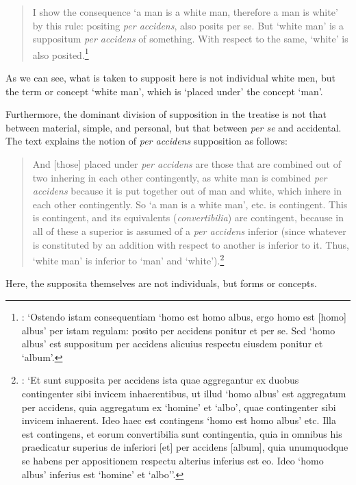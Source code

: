 \documentclass[a4paper, 11pt]{article}
\begin{document}
\begin{quote}
I show the consequence `a man is a white man, therefore a man is white' by this rule: positing \emph{per accidens}, also posits per se. But `white man' is a suppositum \emph{per accidens} of something. With respect to the same, `white' is also posited.\footnote{\autocite[18, par. 34]{Green-Pedersen1980a}: `Ostendo istam consequentiam `homo est homo albus, ergo homo est [homo] albus' per istam regulam: posito per accidens ponitur et per se. Sed `homo albus' est suppositum per accidens alicuius respectu eiusdem ponitur et `album'.}
\end{quote}

As we can see, what is taken to supposit here is not individual white men, but the term or concept `white man', which is `placed under' the concept `man'. 

Furthermore, the dominant division of supposition in the treatise is not that between material, simple, and personal, but that between \emph{per se} and accidental. The text explains the notion of \emph{per accidens} supposition as follows:

\begin{quote}
And [those] placed under \emph{per accidens} are those that are combined out of two inhering in each other contingently, as white man is combined \emph{per accidens} because it is put together out of man and white, which inhere in each other contingently. So `a man is a white man', etc. is contingent. This is contingent, and its equivalents (\emph{convertibilia}) are contingent, because in all of these a superior is assumed of a \emph{per accidens} inferior (since whatever is constituted by an addition with respect to another is inferior to it. Thus, `white man' is inferior to `man' and `white').\footnote{\autocite[19, par. 38]{Green-Pedersen1980a}: `Et sunt supposita per accidens ista quae aggregantur ex duobus contingenter sibi invicem inhaerentibus, ut illud `homo albus' est aggregatum per accidens, quia aggregatum ex `homine' et `albo', quae contingenter sibi invicem inhaerent. Ideo haec est contingens `homo est homo albus' etc. Illa est contingens, et eorum convertibilia sunt contingentia, quia in omnibus his praedicatur superius de inferiori [et] per accidens [album], quia unumquodque se habens per appositionem respectu alterius inferius est eo. Ideo `homo albus' inferius est `homine' et `albo''.}
\end{quote}

Here, the supposita themselves are not individuals, but forms or concepts.
\end{document}
